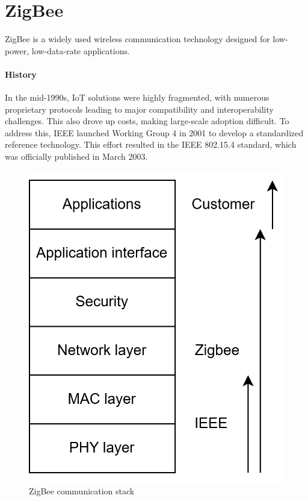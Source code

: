 \section{ZigBee}

ZigBee is a widely used wireless communication technology designed for low-power, low-data-rate applications. 

\paragraph*{History}
In the mid-1990s, IoT solutions were highly fragmented, with numerous proprietary protocols leading to major compatibility and interoperability challenges. 
This also drove up costs, making large-scale adoption difficult.
To address this, IEEE launched Working Group 4 in 2001 to develop a standardized reference technology. 
This effort resulted in the IEEE 802.15.4 standard, which was officially published in March 2003.

\begin{figure}[H]
    \centering
    \includegraphics[width=0.3\linewidth]{images/iot14.png}
    \caption{ZigBee communication stack}
\end{figure}

